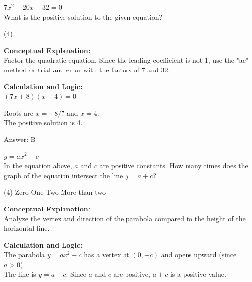 \documentclass[11pt,paper=a4,answers]{exam}
\begin{document}
\begin{questions}
\question
$7x^2 - 20x - 32 = 0$ \\
What is the positive solution to the given equation?
\begin{tasks}(4)
\end{tasks}

\begin{solution}
\textbf{Conceptual Explanation:} \\
Factor the quadratic equation. Since the leading coefficient is not 1, use the "ac" method or trial and error with the factors of 7 and 32.

\vspace{20pt}

\textbf{Calculation and Logic:} \\
$(7x + 8)(x - 4) = 0$

\vspace{10pt}

Roots are $x = -8/7$ and $x = 4$. \\
The positive solution is 4.

\vspace{25pt}

Answer: \colorbox{yellow!100}{B}
\end{solution}

\vspace{40pt}

\question
$y = ax^2 - c$ \\
In the equation above, $a$ and $c$ are positive constants. How many times does the graph of the equation intersect the line $y = a + c$?
\begin{tasks}(4)
    \task Zero
    \task One
    \task Two
    \task More than two
\end{tasks}

\begin{solution}
\textbf{Conceptual Explanation:} \\
Analyze the vertex and direction of the parabola compared to the height of the horizontal line.

\vspace{20pt}

\textbf{Calculation and Logic:} \\
The parabola $y = ax^2 - c$ has a vertex at $(0, -c)$ and opens upward (since $a > 0$). \\
The line is $y = a + c$. Since $a$ and $c$ are positive, $a + c$ is a positive value.


\end{solution}
\end{questions}
\end{document}
